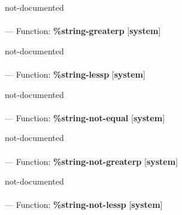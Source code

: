 \begin{adjustwidth}{5em}{5em}
not-documented
\end{adjustwidth}

\paragraph{}
\label{SYSTEM:STRING-GREATERP}
--- Function: \textbf{\%string-greaterp} [\textbf{system}] \textit{}

\begin{adjustwidth}{5em}{5em}
not-documented
\end{adjustwidth}

\paragraph{}
\label{SYSTEM:STRING-LESSP}
--- Function: \textbf{\%string-lessp} [\textbf{system}] \textit{}

\begin{adjustwidth}{5em}{5em}
not-documented
\end{adjustwidth}

\paragraph{}
\label{SYSTEM:STRING-NOT-EQUAL}
--- Function: \textbf{\%string-not-equal} [\textbf{system}] \textit{}

\begin{adjustwidth}{5em}{5em}
not-documented
\end{adjustwidth}

\paragraph{}
\label{SYSTEM:STRING-NOT-GREATERP}
--- Function: \textbf{\%string-not-greaterp} [\textbf{system}] \textit{}

\begin{adjustwidth}{5em}{5em}
not-documented
\end{adjustwidth}

\paragraph{}
\label{SYSTEM:STRING-NOT-LESSP}
--- Function: \textbf{\%string-not-lessp} [\textbf{system}] \textit{}

